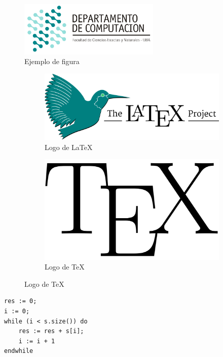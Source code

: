 \documentclass[10pt,a4paper]{article}
\begin{document}

\begin{figure}[ht]
	\centering
	\includegraphics[width=0.6\textwidth]{logo_dc.jpg}
	\caption{Ejemplo de figura}
	\label{fig:ejemplo}
\end{figure}

\begin{figure}[ht!]
	\begin{subfigure}{0.5\textwidth}
		\includegraphics[width=0.9\linewidth]{LaTeX-project} 
		\caption{Logo de LaTeX}
		\label{fig:subfig1}
	\end{subfigure}
	\begin{subfigure}{0.5\textwidth}
		\includegraphics[width=0.7\linewidth]{TeX}
		\caption{Logo de TeX}
		\label{fig:subfig2}
	\end{subfigure}
	\label{fig:subfigs}
\end{figure}



	\begin{lstlisting}[caption={Ejemplo de código (usando los estilos de la cátedra, ver las macros para más detalles)},label=code:for]
res := 0;
i := 0;
while (i < s.size()) do
	res := res + s[i];
	i := i + 1
endwhile
	\end{lstlisting}
\end{document}
